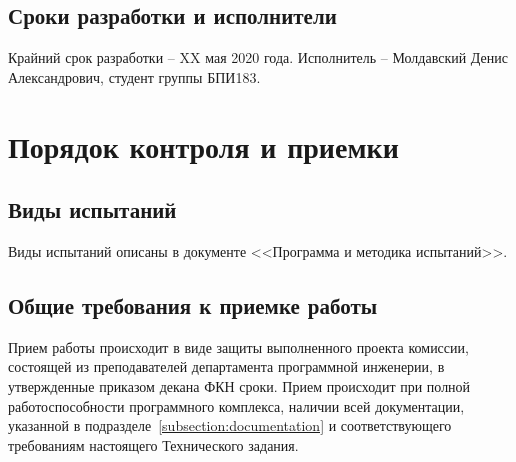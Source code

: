 \documentclass[techtask]{espd}
\begin{document}
\subsection{Сроки разработки и исполнители}
Крайний срок разработки -- XX мая 2020 года. Исполнитель -- Молдавский Денис Александрович, студент группы БПИ183.

\section{Порядок контроля и приемки}
\subsection{Виды испытаний}
Виды испытаний описаны в документе <<Программа и методика испытаний>>.

\subsection{Общие требования к приемке работы}
Прием работы происходит в виде защиты выполненного проекта комиссии, состоящей из преподавателей департамента программной инженерии, в утвержденные приказом декана ФКН сроки. Прием происходит при полной работоспособности программного комплекса, наличии всей документации, указанной в подразделе~\ref{subsection:documentation} и соответствующего требованиям настоящего Технического задания.


\end{document}
